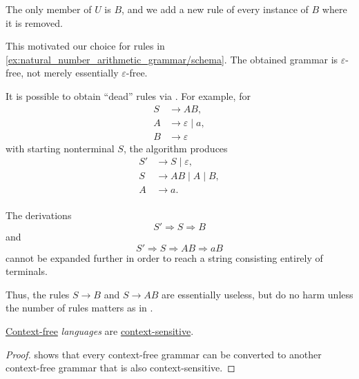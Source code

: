 \begin{example}
\begin{thmenum}
    The only member of \( U \) is \( B \), and we add a new rule of every instance of \( B \) where it is removed.

    This motivated our choice for rules in \cref{ex:natural_number_arithmetic_grammar/schema}. The obtained grammar is \( \varepsilon \)-free, not merely essentially \( \varepsilon \)-free.

     It is possible to obtain \enquote{dead} rules via . For example, for
    \begin{equation*}
      \begin{aligned}
        S &\to A B, \\
        A &\to \varepsilon \mid a, \\
        B &\to \varepsilon
      \end{aligned}
    \end{equation*}
    with starting nonterminal \( S \), the algorithm produces
    \begin{equation*}
      \begin{aligned}
        S' &\to S \mid \varepsilon, \\
        S &\to A B \mid A \mid B, \\
        A &\to a. \\
      \end{aligned}
    \end{equation*}

    The derivations
    \begin{equation*}
      S' \Rightarrow S \Rightarrow B
    \end{equation*}
    and
    \begin{equation*}
      S' \Rightarrow S \Rightarrow A B \Rightarrow a B
    \end{equation*}
    cannot be expanded further in order to reach a string consisting entirely of terminals.

    Thus, the rules \( S \to B \) and \( S \to A B \) are essentially useless, but do no harm unless the number of rules matters as in .
  \end{thmenum}
\end{example}

\begin{proposition}\label{thm:context_free_languages_are_context_sensitive}
  \hyperref[def:chomsky_hierarchy/context_free]{Context-free} \emph{languages} are \hyperref[def:chomsky_hierarchy/context_sensitive]{context-sensitive}.
\end{proposition}
\begin{proof}
   shows that every context-free grammar can be converted to another context-free grammar that is also context-sensitive.
\end{proof}

